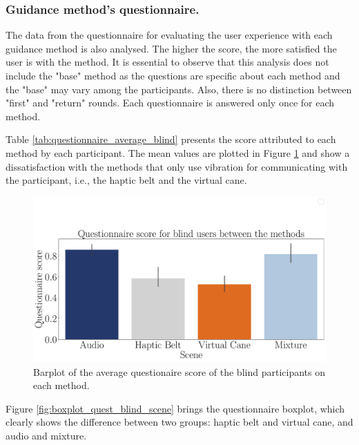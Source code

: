 \subsubsection{Guidance method's questionnaire.}
\label{subsubsec:results_questionnaires}

The data from the questionnaire for evaluating the user experience with each guidance method is also analysed. The higher the score, the more satisfied the user is with the method. It is essential to observe that this analysis does not include the "base" method as the questions are specific about each method and the "base" may vary among the participants. Also, there is no distinction between "first" and "return" rounds. Each questionnaire is answered only once for each method.

Table \ref{tab:questionnaire_average_blind} presents the score attributed to each method by each participant. The mean values are plotted in Figure \ref{fig:barplot_questionnaire_scene_blind} and show a dissatisfaction with the methods that only use vibration for communicating with the participant, i.e., the haptic belt and the virtual cane. 



\begin{figure}[!htb]
    \centering
    \includegraphics[width = \textwidth]{Resultados/Questionario/Figuras/pdf/barplot_questionnaire_scene_blind.pdf}
    \caption{Barplot of the average questionaire score of the blind participants on each method.}
    \label{fig:barplot_questionnaire_scene_blind}
\end{figure}

Figure \ref{fig:boxplot_quest_blind_scene} brings the questionnaire boxplot, which clearly shows the difference between two groups: haptic belt and virtual cane, and audio and mixture. 


